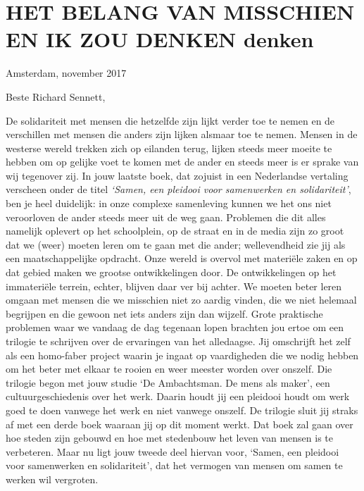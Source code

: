 \documentclass[]{book}
\begin{document}
\hypertarget{het-belang-van-misschien-en-ik-zou-denken-denken}{%
\chapter*{HET BELANG VAN MISSCHIEN EN IK ZOU DENKEN
denken}\label{het-belang-van-misschien-en-ik-zou-denken-denken}}

Amsterdam, november 2017

Beste Richard Sennett,

De solidariteit met mensen die hetzelfde zijn lijkt verder toe te nemen
en de verschillen met mensen die anders zijn lijken alsmaar toe te
nemen. Mensen in de westerse wereld trekken zich op eilanden terug,
lijken steeds meer moeite te hebben om op gelijke voet te komen met de
ander en steeds meer is er sprake van wij tegenover zij. In jouw laatste
boek, dat zojuist in een Nederlandse vertaling verscheen onder de titel
\emph{`Samen, een pleidooi voor samenwerken en solidariteit'}, ben je
heel duidelijk: in onze complexe samenleving kunnen we het ons niet
veroorloven de ander steeds meer uit de weg gaan. Problemen die dit
alles namelijk oplevert op het schoolplein, op de straat en in de media
zijn zo groot dat we (weer) moeten leren om te gaan met die ander;
wellevendheid zie jij als een maatschappelijke opdracht. Onze wereld is
overvol met materiële zaken en op dat gebied maken we grootse
ontwikkelingen door. De ontwikkelingen op het immateriële terrein,
echter, blijven daar ver bij achter. We moeten beter leren omgaan met
mensen die we misschien niet zo aardig vinden, die we niet helemaal
begrijpen en die gewoon net iets anders zijn dan wijzelf. Grote
praktische problemen waar we vandaag de dag tegenaan lopen brachten jou
ertoe om een trilogie te schrijven over de ervaringen van het
alledaagse. Jij omschrijft het zelf als een homo-faber project waarin je
ingaat op vaardigheden die we nodig hebben om het beter met elkaar te
rooien en weer meester worden over onszelf. Die trilogie begon met jouw
studie `De Ambachtsman. De mens als maker', een cultuurgeschiedenis over
het werk. Daarin houdt jij een pleidooi houdt om werk goed te doen
vanwege het werk en niet vanwege onszelf. De trilogie sluit jij straks
af met een derde boek waaraan jij op dit moment werkt. Dat boek zal gaan
over hoe steden zijn gebouwd en hoe met stedenbouw het leven van mensen
is te verbeteren. Maar nu ligt jouw tweede deel hiervan voor, `Samen,
een pleidooi voor samenwerken en solidariteit', dat het vermogen van
mensen om samen te werken wil vergroten.
\end{document}
